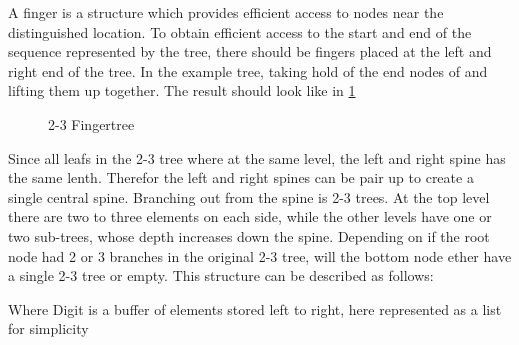 A finger is a structure which provides efficient access to nodes near the distinguished location. To obtain efficient access to the start and end of the sequence represented by the tree, there should be fingers placed at the left and right end of the tree. In the example tree, taking hold of the end nodes of and lifting them up together. The result should look like in \cref{fig:fingertree}
\begin{figure}[!h]
  \centering
  \caption{2-3 Fingertree
  \label{fig:fingertree}}
\end{figure}

Since all leafs in the 2-3 tree where at the same level, the left and right spine has the same lenth. Therefor the left and right spines can be pair up to create a single central spine. Branching out from the spine is 2-3 trees. At the top level there are two to three elements on each side, while the other levels have one or two sub-trees, whose depth increases down the spine. Depending on if the root node had 2 or 3 branches in the original 2-3 tree, will the bottom node ether have a single 2-3 tree or empty. This structure can be described as follows:

Where Digit is a buffer of elements stored left to right, here represented as a list for simplicity

